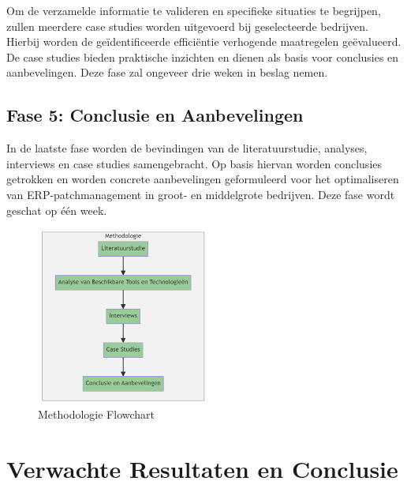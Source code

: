 Om de verzamelde informatie te valideren en specifieke situaties te begrijpen, zullen meerdere case studies worden uitgevoerd bij geselecteerde bedrijven. Hierbij worden de geïdentificeerde efficiëntie verhogende maatregelen geëvalueerd. De case studies bieden praktische inzichten en dienen als basis voor conclusies en aanbevelingen. Deze fase zal ongeveer drie weken in beslag nemen.

\subsection{Fase 5: Conclusie en Aanbevelingen}

In de laatste fase worden de bevindingen van de literatuurstudie, analyses, interviews en case studies samengebracht. Op basis hiervan worden conclusies getrokken en worden concrete aanbevelingen geformuleerd voor het optimaliseren van ERP-patchmanagement in groot- en middelgrote bedrijven. Deze fase wordt geschat op één week.

\begin{figure}
    \centering
    \includegraphics[width=0.5\textwidth]{methodologie.png}
    \caption{Methodologie Flowchart}
    \label{Methodologie Flowchart}
\end{figure}



\section{Verwachte Resultaten en Conclusie}%
\label{sec:verwachte-resultaten}


